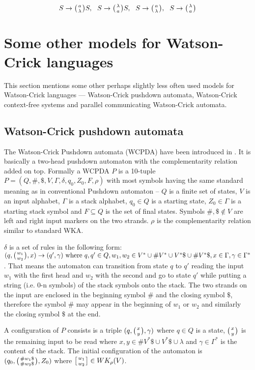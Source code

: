 $$S \rightarrow \wkpair{a}{\lambda} S, \:\:\: S \rightarrow \wkpair{\lambda}{a} S, \:\:\: S \rightarrow \wkpair{a}{\lambda}, \:\:\: S \rightarrow \wkpair{\lambda}{a}$$

\section{Some other models for Watson-Crick languages}
This section mentions some other perhaps slightly less often used models for Watson-Crick languages --- Watson-Crick pushdown automata, Watson-Crick context-free systems and parallel communicating Watson-Crick automata.

\subsection{Watson-Crick pushdown automata}
The Watson-Crick Pushdown automata (WCPDA) have been introduced in \cite{WK_PUSHDOWN_AUT}. It is basically a two-head pushdown automaton with the complementarity relation added on top. Formally a WCPDA $P$ is a 10-tuple $P = (Q, \#, \$, V, \Gamma, \delta, q_0, Z_0, F, \rho)$ with most symbols having the same standard meaning as in conventional Pushdown automaton -- $Q$ is a finite set of states, $V$ is an input alphabet, $\Gamma$ is a stack alphabet, $q_0 \in Q$ is a starting state, $Z_0 \in \Gamma$ is a starting stack symbol and $F \subseteq Q$ is the set of final states. Symbols $\#, \$ \notin V$ are left and right input markers on the two strands. $\rho$ is the complementarity relation similar to standard WKA.

$\delta$ is a set of rules in the following form: $(q, \wkpair{w_1}{w_2}, x) \rightarrow (q', \gamma) \textnormal{ where } q, q' \in Q, w_1, w_2 \in V^* \cup \#V^* \cup V^*\$ \cup \#V^*\$, x \in \Gamma, \gamma \in \Gamma^*$. That means the automaton can transition from state $q$ to $q'$ reading the input $w_1$ with the first head and $w_2$ with the second and go to state $q'$ while putting a string (i.e. 0-n symbols) of the stack symbols onto the stack. The two strands on the input are enclosed in the beginning symbol $\#$ and the closing symbol $\$$, therefore the symbol $\#$ may appear in the beginning of $w_1$ or $w_2$ and similarly the closing symbol $\$$ at the end.

A configuration of $P$ consists is a triple $(q, \wkpair{x}{y}, \gamma)$ where $q \in Q$ is a state, $\wkpair{x}{y}$ is the remaining input to be read where $x, y \in \#V^*\$ \cup V^*\$ \cup \lambda$ and $\gamma \in \Gamma^*$ is the content of the stack. The initial configuration of the automaton is $(q_0, \wkpair{\#w_1\$}{\#w_2\$}, Z_0)$ where $\wkdomain{w_1}{w_2} \in WK_{\rho}(V)$.

